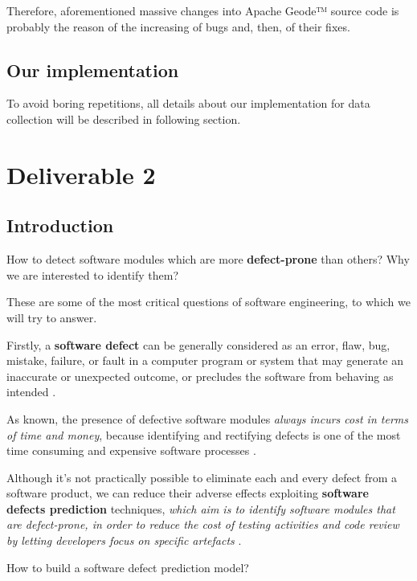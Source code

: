 \documentclass[sigconf]{acmart}
\begin{document}
\begin{itemize}
\begin{itemize}
Therefore, aforementioned massive changes into Apache Geode™ source code is probably the reason of the increasing of bugs and, then, of their fixes.

\end{itemize}
\end{itemize}

\subsection{Our implementation}

To avoid boring repetitions, all details about our implementation for data collection will be described in following section. 

\section{Deliverable 2}

\subsection{Introduction}

How to detect software modules which are more \textbf{defect-prone} than others? Why we are interested to identify them? 

These are some of the most critical questions of software engineering, to which we will try to answer. 

Firstly, a \textbf{software defect} can be generally considered as an error, flaw, bug, mistake, failure, or fault in a computer program or system that may generate an inaccurate or unexpected outcome, or precludes the software from behaving as intended \cite{SoftwareDefectPredictionRawat}.

As known, the presence of defective software modules \textit{always incurs cost in terms of time and money}, because identifying and rectifying defects is one of the most time consuming and expensive software processes \cite{SoftwareDefectPredictionRawat}.

Although it's not practically possible to eliminate each and every defect from a software product, we can reduce their adverse effects exploiting \textbf{software defects prediction} techniques, \textit{which aim is to identify software modules that are defect-prone, in order to reduce the cost of testing activities and code review by letting developers focus on specific artefacts} \citep{Falessi}.

How to build a software defect prediction model? 
\end{document}
